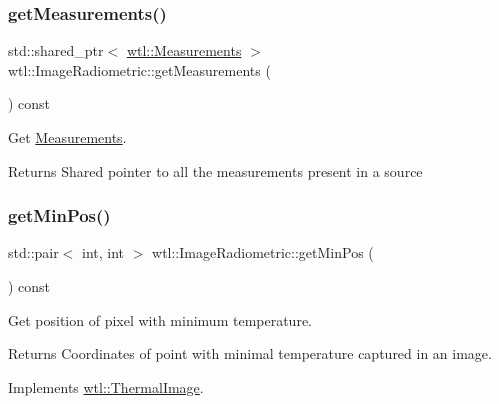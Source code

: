 \subsubsection{\texorpdfstring{get\+Measurements()}{getMeasurements()}}
{\footnotesize\ttfamily std\+::shared\+\_\+ptr$<$ \hyperlink{classwtl_1_1_measurements}{wtl\+::\+Measurements} $>$ wtl\+::\+Image\+Radiometric\+::get\+Measurements (\begin{DoxyParamCaption}{ }\end{DoxyParamCaption}) const}



Get \hyperlink{classwtl_1_1_measurements}{Measurements}. 

\begin{DoxyReturn}{Returns}
Shared pointer to all the measurements present in a source 
\end{DoxyReturn}
\mbox{\label{classwtl_1_1_image_radiometric_a4f8f918914c3de913e781de02c42e846}} 
\subsubsection{\texorpdfstring{get\+Min\+Pos()}{getMinPos()}}
{\footnotesize\ttfamily std\+::pair$<$ int, int $>$ wtl\+::\+Image\+Radiometric\+::get\+Min\+Pos (\begin{DoxyParamCaption}{ }\end{DoxyParamCaption}) const\hspace{0.3cm}{\ttfamily [virtual]}}



Get position of pixel with minimum temperature. 

\begin{DoxyReturn}{Returns}
Coordinates of point with minimal temperature captured in an image. 
\end{DoxyReturn}


Implements \hyperlink{classwtl_1_1_thermal_image_a9887878b3965566660ce4c434873603a}{wtl\+::\+Thermal\+Image}.

\mbox{\label{classwtl_1_1_image_radiometric_af615da6d48d04f430d8806edcd3fa61e}} 
